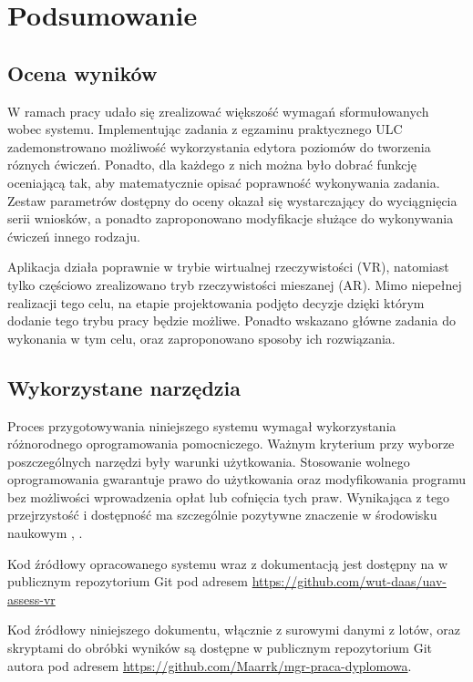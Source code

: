 \newpage
\section{Podsumowanie}

\subsection{Ocena wyników}
W ramach pracy udało się zrealizować większość wymagań sformułowanych wobec systemu. Implementując zadania z egzaminu praktycznego ULC zademonstrowano możliwość wykorzystania edytora poziomów do tworzenia róznych ćwiczeń. Ponadto, dla każdego z nich można było dobrać funkcję oceniającą tak, aby matematycznie opisać poprawność wykonywania zadania. Zestaw parametrów dostępny do oceny okazał się wystarczający do wyciągnięcia serii wniosków, a ponadto zaproponowano modyfikacje służące do wykonywania ćwiczeń innego rodzaju.

Aplikacja działa poprawnie w trybie wirtualnej rzeczywistości (VR), natomiast tylko częściowo zrealizowano tryb rzeczywistości mieszanej (AR). Mimo niepełnej realizacji tego celu, na etapie projektowania podjęto decyzje dzięki którym dodanie tego trybu pracy będzie możliwe. Ponadto wskazano główne zadania do wykonania w tym celu, oraz zaproponowano sposoby ich rozwiązania.

\subsection{Wykorzystane narzędzia}
Proces przygotowywania niniejszego systemu wymagał wykorzystania różnorodnego oprogramowania pomocniczego. Ważnym kryterium przy wyborze poszczególnych narzędzi były warunki użytkowania. Stosowanie wolnego oprogramowania gwarantuje prawo do użytkowania oraz modyfikowania programu bez możliwości wprowadzenia opłat lub cofnięcia tych praw. Wynikająca z tego przejrzystość i dostępność ma szczególnie pozytywne znaczenie w środowisku naukowym \cite{courant2006}, \cite{lakhan2008}.

Kod źródłowy opracowanego systemu wraz z dokumentacją jest dostępny na w publicznym repozytorium Git pod adresem \url{https://github.com/wut-daas/uav-assess-vr}

Kod źródłowy niniejszego dokumentu, włącznie z surowymi danymi z lotów, oraz skryptami do obróbki wyników są dostępne w publicznym repozytorium Git autora pod adresem \url{https://github.com/Maarrk/mgr-praca-dyplomowa}.

